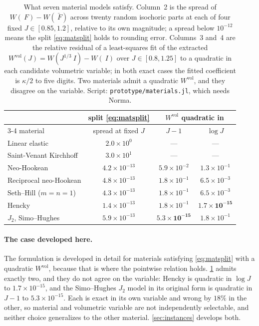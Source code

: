 \documentclass{article}
\newcommand{\F}{~F}
\newcommand{\Id}{~I}
\newcommand{\supvol}{^{\mathrm{vol}}}
\newcommand{\code}[1]{\texttt{#1}}
\theoremstyle{definition}
\theoremstyle{plain}
\begin{document}
\begin{table}[tbp]
  \centering
  \caption{What seven material models satisfy. Column~2 is the
  spread of $W(\F) - W(\bar{\F})$ across twenty random isochoric parts at each
  of four fixed $J \in [0.85, 1.2]$, relative to its own magnitude; a spread
  below $10^{-12}$ means the split \eqref{eq:matsplit} holds to rounding
  error. Columns~3 and~4 are the
  relative residual of a least-squares fit of the extracted $W\supvol(J) =
  W(J^{1/3}\Id) - W(\Id)$ over $J \in [0.8, 1.25]$ to a quadratic in each
  candidate volumetric variable; in both exact cases the fitted coefficient is
  $\kappa/2$ to five digits. Two materials admit a quadratic $W\supvol$, and
  they disagree on the variable. Script: \code{prototype/materials.jl}, which
  needs Norma.}
  \label{tab:split}
  \begin{tabular}{lccc}
    \toprule
    & split \eqref{eq:matsplit} & \multicolumn{2}{c}{$W\supvol$ quadratic in} \\
    \cmidrule(lr){3-4}
    material & spread at fixed $J$ & $J - 1$ & $\log J$ \\
    \midrule
    Linear elastic              & $2.0\times10^{0}$   & ---                 & ---                 \\
    Saint-Venant Kirchhoff      & $3.0\times10^{1}$   & ---                 & ---                 \\
    Neo-Hookean                 & $4.2\times10^{-13}$ & $5.9\times10^{-2}$  & $1.3\times10^{-1}$  \\
    Reciprocal neo-Hookean      & $4.8\times10^{-13}$ & $1.8\times10^{-1}$  & $6.5\times10^{-3}$  \\
    Seth--Hill ($m = n = 1$)    & $4.3\times10^{-13}$ & $1.8\times10^{-1}$  & $6.5\times10^{-3}$  \\
    Hencky                      & $1.4\times10^{-13}$ & $1.8\times10^{-1}$  & $\mathbf{1.7\times10^{-15}}$ \\
    $J_2$, Simo--Hughes         & $5.9\times10^{-13}$ & $\mathbf{5.3\times10^{-15}}$ & $1.8\times10^{-1}$  \\
    \bottomrule
  \end{tabular}
\end{table}

\paragraph{The case developed here.} The formulation is developed in detail
for materials satisfying \eqref{eq:matsplit} with a quadratic
$W\supvol$, because that is where the pointwise relation holds.
\cref{tab:split} admits exactly two, and they do
not agree on the variable: Hencky is quadratic in $\log J$ to
$1.7\times10^{-15}$, and the Simo--Hughes $J_2$ model in its original form is quadratic in
$J-1$ to $5.3\times10^{-15}$. Each is exact in its
own variable and wrong by $18\%$ in the other, so material and volumetric
variable are not independently selectable, and neither choice generalizes to
the other material. \cref{sec:instances} develops both.
\end{document}
